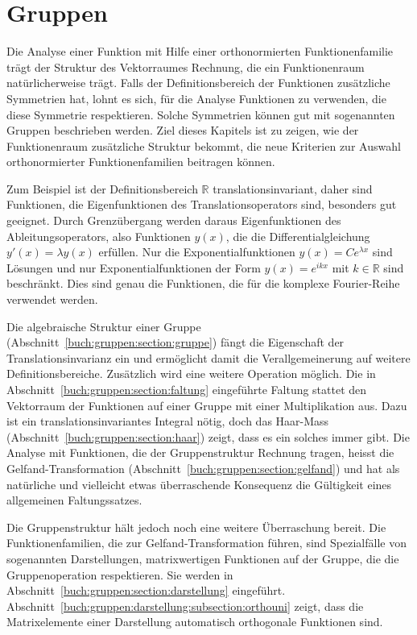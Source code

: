 %
%
%
\chapter{Gruppen
\label{buch:chapter:gruppen}}
Die Analyse einer Funktion mit Hilfe einer orthonormierten
Funktionenfamilie trägt der Struktur des Vektorraumes Rechnung,
die ein Funktionenraum natürlicherweise trägt.
Falls der Definitionsbereich der Funktionen zusätzliche Symmetrien
hat, lohnt es sich, für die Analyse Funktionen zu verwenden, die
diese Symmetrie respektieren.
Solche Symmetrien können gut mit sogenannten Gruppen beschrieben
werden.
Ziel dieses Kapitels ist zu zeigen, wie der Funktionenraum
zusätzliche Struktur bekommt, die neue Kriterien zur Auswahl orthonormierter
Funktionenfamilien beitragen können.

Zum Beispiel ist der Definitionsbereich $\mathbb{R}$ translationsinvariant,
daher sind Funktionen, die Eigenfunktionen des Translationsoperators
sind, besonders gut geeignet. 
Durch Grenzübergang werden daraus Eigenfunktionen des Ableitungsoperators,
also Funktionen $y(x)$, die die Differentialgleichung $y'(x)=\lambda y(x)$
erfüllen.
Nur die Exponentialfunktionen $y(x)=Ce^{\lambda x}$ sind Lösungen und nur
Exponentialfunktionen der Form $y(x)=e^{ikx}$ mit $k\in\mathbb{R}$
sind beschränkt.
Dies sind genau die Funktionen, die für die komplexe Fourier-Reihe
verwendet werden.

Die algebraische Struktur einer Gruppe
(Abschnitt~\ref{buch:gruppen:section:gruppe})
fängt die Eigenschaft der Translationsinvarianz ein und ermöglicht
damit die Verallgemeinerung auf weitere Definitionsbereiche.
Zusätzlich wird eine weitere Operation möglich.
Die in Abschnitt~\ref{buch:gruppen:section:faltung} eingeführte
Faltung stattet den Vektorraum der Funktionen auf einer Gruppe
mit einer Multiplikation aus.
Dazu ist ein translationsinvariantes Integral nötig, doch das
Haar-Mass (Abschnitt~\ref{buch:gruppen:section:haar}) zeigt,
%
dass es ein solches immer gibt.
Die Analyse mit Funktionen, die der Gruppenstruktur Rechnung tragen,
heisst die Gelfand-Transformation
%
(Abschnitt~\ref{buch:gruppen:section:gelfand})
und hat als natürliche und vielleicht
etwas überraschende Konsequenz die Gültigkeit eines allgemeinen
Faltungssatzes.

Die Gruppenstruktur hält jedoch noch eine weitere Überraschung bereit.
Die Funktionenfamilien, die zur Gelfand-Transformation führen,
sind Spezialfälle von sogenannten Darstellungen, matrixwertigen
%
Funktionen auf der Gruppe, die die Gruppenoperation respektieren.
Sie werden in Abschnitt~\ref{buch:gruppen:section:darstellung}
eingeführt.
Abschnitt~\ref{buch:gruppen:darstellung:subsection:orthouni}
zeigt, dass die Matrixelemente einer Darstellung automatisch
orthogonale Funktionen sind.

